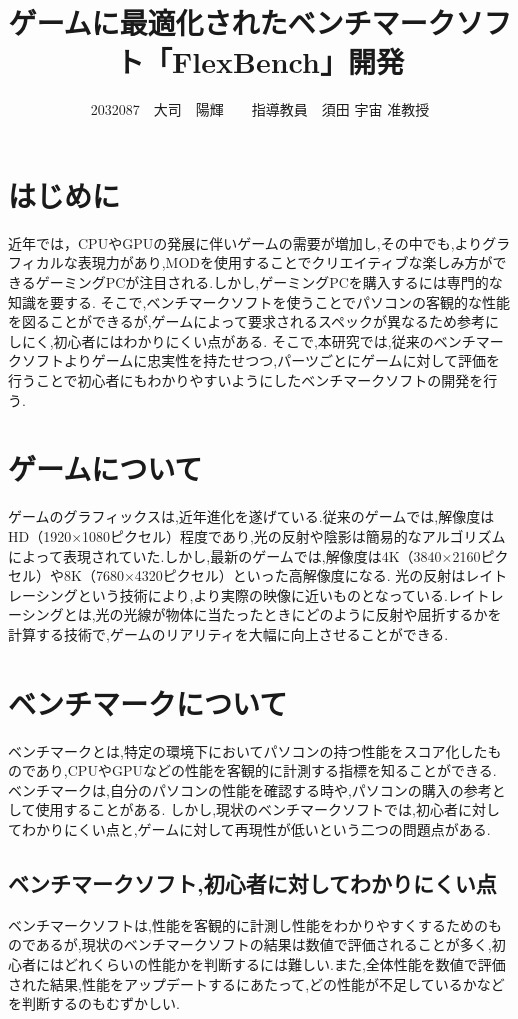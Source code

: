 \documentclass[twocolumn,10pt,a4j]{ltjsarticle}
\title{ゲームに最適化されたベンチマークソフト「FlexBench」開発}
\author{2032087　大司　陽輝　　指導教員　須田 宇宙 准教授}
\date{}
\begin{document}
\maketitle

\section{はじめに}
近年では，CPUやGPUの発展に伴いゲームの需要が増加し,その中でも,よりグラフィカルな表現力があり,MODを使用することでクリエイティブな楽しみ方ができるゲーミングPCが注目される.しかし,ゲーミングPCを購入するには専門的な知識を要する.
そこで,ベンチマークソフトを使うことでパソコンの客観的な性能を図ることができるが,ゲームによって要求されるスペックが異なるため参考にしにく,初心者にはわかりにくい点がある.
そこで,本研究では,従来のベンチマークソフトよりゲームに忠実性を持たせつつ,パーツごとにゲームに対して評価を行うことで初心者にもわかりやすいようにしたベンチマークソフトの開発を行う.

\section{ゲームについて}
ゲームのグラフィックスは,近年進化を遂げている.従来のゲームでは,解像度はHD（1920$\times$1080ピクセル）程度であり,光の反射や陰影は簡易的なアルゴリズムによって表現されていた.しかし,最新のゲームでは,解像度は4K（3840$\times$2160ピクセル）や8K（7680$\times$4320ピクセル）といった高解像度になる.
光の反射はレイトレーシングという技術により,より実際の映像に近いものとなっている.レイトレーシングとは,光の光線が物体に当たったときにどのように反射や屈折するかを計算する技術で,ゲームのリアリティを大幅に向上させることができる.

\section{ベンチマークについて}
ベンチマークとは,特定の環境下においてパソコンの持つ性能をスコア化したものであり,CPUやGPUなどの性能を客観的に計測する指標を知ることができる.
ベンチマークは,自分のパソコンの性能を確認する時や,パソコンの購入の参考として使用することがある.
しかし,現状のベンチマークソフトでは,初心者に対してわかりにくい点と,ゲームに対して再現性が低いという二つの問題点がある.

 \subsection{ベンチマークソフト,初心者に対してわかりにくい点}
ベンチマークソフトは,性能を客観的に計測し性能をわかりやすくするためのものであるが,現状のベンチマークソフトの結果は数値で評価されることが多く,初心者にはどれくらいの性能かを判断するには難しい.また,全体性能を数値で評価された結果,性能をアップデートするにあたって,どの性能が不足しているかなどを判断するのもむずかしい.
\end{document}
